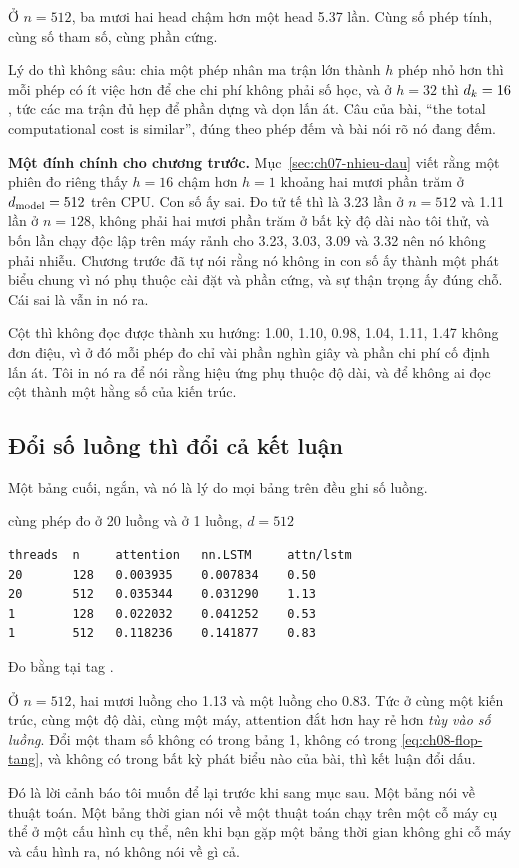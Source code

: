Ở \(n = 512\), ba mươi hai head chậm hơn một head 5.37 lần. Cùng số phép tính,
cùng số tham số, cùng phần cứng.

Lý do thì không sâu: chia một phép nhân ma trận lớn thành \(h\) phép nhỏ hơn thì
mỗi phép có ít việc hơn để che chi phí không phải số học, và ở \(h = 32\) thì
\(d_{k} = 16\), tức các ma trận đủ hẹp để phần dựng và dọn lấn át. Câu của bài,
\enquote{the total computational cost is similar}, đúng theo phép đếm và bài nói
rõ nó đang đếm.

%
\textbf{Một đính chính cho chương trước.} Mục~\ref{sec:ch07-nhieu-dau} viết rằng
một phiên đo riêng thấy \(h = 16\) chậm hơn \(h = 1\) khoảng hai mươi phần trăm
ở \(d_{\mathrm{model}} = 512\) trên CPU. Con số ấy sai. Đo tử tế thì là 3.23 lần ở
\(n = 512\) và 1.11 lần ở \(n = 128\), không phải hai mươi phần trăm ở bất kỳ độ
dài nào tôi thử, và bốn lần chạy độc lập trên máy rảnh cho 3.23, 3.03, 3.09 và
3.32 nên nó không phải nhiễu. Chương trước đã tự nói rằng nó không in con số ấy thành một
phát biểu chung vì nó phụ thuộc cài đặt và phần cứng, và sự thận trọng ấy đúng
chỗ. Cái sai là vẫn in nó ra.

Cột  thì không đọc được thành xu hướng: 1.00, 1.10, 0.98, 1.04,
1.11, 1.47 không đơn điệu, vì ở đó mỗi phép đo chỉ vài phần
nghìn giây và phần chi phí cố định lấn át. Tôi in nó ra để nói rằng hiệu ứng phụ
thuộc độ dài, và để không ai đọc cột  thành một hằng số của kiến
trúc.

\subsection*{Đổi số luồng thì đổi cả kết luận}

%
Một bảng cuối, ngắn, và nó là lý do mọi bảng trên đều ghi số luồng.

\begin{measured}{cùng phép đo ở 20 luồng và ở 1 luồng, \(d = 512\)}
\begin{verbatim}
threads  n     attention   nn.LSTM     attn/lstm
20       128   0.003935    0.007834    0.50
20       512   0.035344    0.031290    1.13
1        128   0.022032    0.041252    0.53
1        512   0.118236    0.141877    0.83
\end{verbatim}

Đo bằng  tại tag .
\end{measured}

Ở \(n = 512\), hai mươi luồng cho 1.13 và một luồng cho 0.83. Tức ở cùng một
kiến trúc, cùng một độ dài, cùng một máy, attention đắt hơn hay rẻ hơn
 \emph{tùy vào số luồng}. Đổi một tham số không có trong bảng 1, không có
trong \eqref{eq:ch08-flop-tang}, và không có trong bất kỳ phát biểu nào của bài,
thì kết luận đổi dấu.

Đó là lời cảnh báo tôi muốn để lại trước khi sang mục sau. Một bảng
nói về thuật toán. Một bảng thời gian nói về một thuật toán chạy trên một cỗ máy
cụ thể ở một cấu hình cụ thể, nên khi bạn gặp một bảng thời gian không ghi cỗ
máy và cấu hình ra, nó không nói về gì cả.
